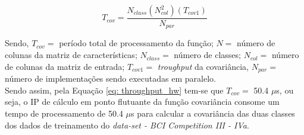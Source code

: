 \begin{equation}
\label{eq: throughput_hw}
T_{cov} = \frac{N_{class}(N_{col}^2)(T_{cov1})}{N_{par}} 
\end{equation}

Sendo, $T_{cov} =$ período total de processamento da função; $N =$ número de colunas da matriz de características; $N_{class} =$ número de classes; $N_{col} =$ número de colunas da matriz de entrada; $T_{cov1} =$ \textit{troughput} da covariância, $N_{par} =$ número de implementações sendo executadas em paralelo.\\
Sendo assim, pela Equação \ref{eq: throughput_hw} tem-se que $T_{cov} =$ 50.4 $\mu$s, ou seja, o IP de cálculo em ponto flutuante da função covariância consome um tempo de processamento de 50.4 $\mu$s para calcular a covariância das duas classes dos dados de treinamento do \textit{data-set - BCI Competition III - IVa}.

